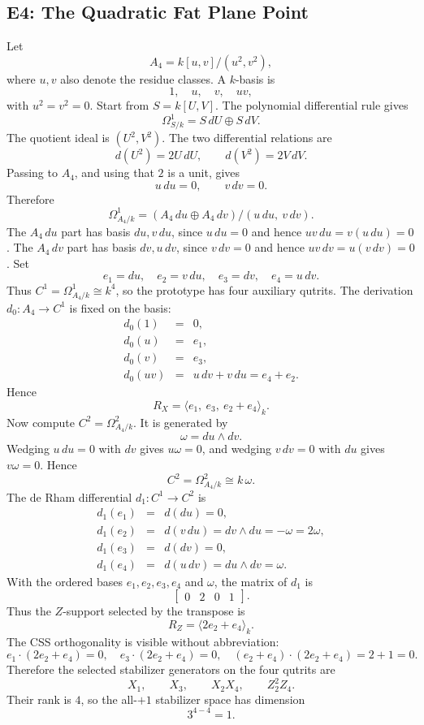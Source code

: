 \subsection{E4: The Quadratic Fat Plane Point}
Let
\[
  A_4=k[u,v]/(u^2,v^2),
\]
where \(u,v\) also denote the residue classes.  A \(k\)-basis is
\[
  1,\quad u,\quad v,\quad uv,
\]
with \(u^2=v^2=0\).  Start from \(S=k[U,V]\).  The polynomial differential
rule gives
\[
  \Omega^1_{S/k}=S\,dU\oplus S\,dV.
\]
The quotient ideal is \((U^2,V^2)\).  The two differential relations are
\[
  d(U^2)=2U\,dU,\qquad d(V^2)=2V\,dV.
\]
Passing to \(A_4\), and using that \(2\) is a unit, gives
\[
  u\,du=0,\qquad v\,dv=0.
\]
Therefore
\[
  \Omega^1_{A_4/k}
  =
  (A_4\,du\oplus A_4\,dv)/(u\,du,\ v\,dv).
\]
The \(A_4\,du\) part has basis \(du,v\,du\), since \(u\,du=0\) and hence
\(uv\,du=v(u\,du)=0\).  The \(A_4\,dv\) part has basis \(dv,u\,dv\), since
\(v\,dv=0\) and hence \(uv\,dv=u(v\,dv)=0\).  Set
\[
  e_1=du,\quad e_2=v\,du,\quad e_3=dv,\quad e_4=u\,dv.
\]
Thus \(C^1=\Omega^1_{A_4/k}\cong k^4\), so the prototype has four auxiliary
qutrits.
The derivation \(d_0:A_4\to C^1\) is fixed on the basis:
\[
\begin{array}{rcl}
d_0(1)&=&0,\\
d_0(u)&=&e_1,\\
d_0(v)&=&e_3,\\
d_0(uv)&=&u\,dv+v\,du=e_4+e_2.
\end{array}
\]
Hence
\[
  R_X=\langle e_1,\ e_3,\ e_2+e_4\rangle_k.
\]
Now compute \(C^2=\Omega^2_{A_4/k}\).  It is generated by
\[
  \omega=du\wedge dv.
\]
Wedging \(u\,du=0\) with \(dv\) gives \(u\omega=0\), and wedging
\(v\,dv=0\) with \(du\) gives \(v\omega=0\).  Hence
\[
  C^2=\Omega^2_{A_4/k}\cong k\,\omega.
\]
The de Rham differential \(d_1:C^1\to C^2\) is
\[
\begin{array}{rcl}
d_1(e_1)&=&d(du)=0,\\
d_1(e_2)&=&d(v\,du)=dv\wedge du=-\omega=2\omega,\\
d_1(e_3)&=&d(dv)=0,\\
d_1(e_4)&=&d(u\,dv)=du\wedge dv=\omega.
\end{array}
\]
With the ordered bases \(e_1,e_2,e_3,e_4\) and \(\omega\), the matrix of
\(d_1\) is
\[
  \begin{bmatrix}0&2&0&1\end{bmatrix}.
\]
Thus the \(Z\)-support selected by the transpose is
\[
  R_Z=\langle 2e_2+e_4\rangle_k.
\]
The CSS orthogonality is visible without abbreviation:
\[
  e_1\cdot(2e_2+e_4)=0,\quad
  e_3\cdot(2e_2+e_4)=0,\quad
  (e_2+e_4)\cdot(2e_2+e_4)=2+1=0.
\]
Therefore the selected stabilizer generators on the four qutrits are
\[
  X_1,\qquad X_3,\qquad X_2X_4,\qquad Z_2^2Z_4.
\]
Their rank is \(4\), so the all-\(+1\) stabilizer space has dimension
\[
  3^{4-4}=1.
\]

